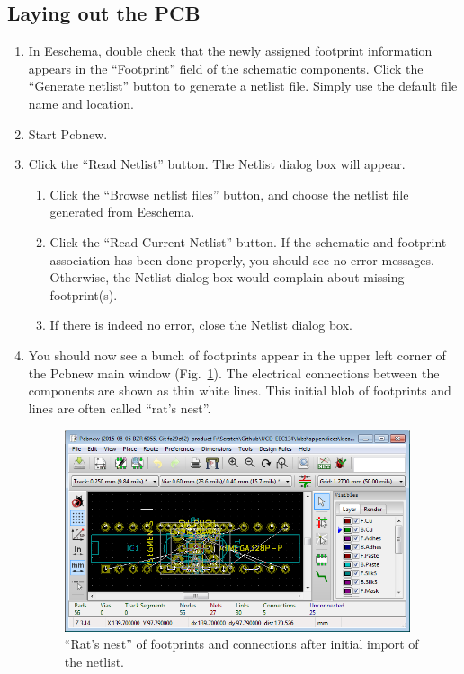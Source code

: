 \documentclass[12pt,letterpaper]{scrartcl}
\begin{document}
\subsection{Laying out the PCB}
\label{sec:pcb-layout}

\begin{enumerate}
	\item In Eeschema, double check that the newly assigned footprint information appears in the ``Footprint'' field of the schematic components. Click the ``Generate netlist'' button to generate a netlist file. Simply use the default file name and location. 
	\item Start Pcbnew. 
	\item Click the ``Read Netlist'' button. The Netlist dialog box will appear. 
		\begin{enumerate}
			\item Click the ``Browse netlist files'' button, and choose the netlist file generated from Eeschema. 
			
			\item Click the ``Read Current Netlist'' button. If the schematic and footprint association has been done properly, you should see no error messages. Otherwise, the Netlist dialog box would complain about missing footprint(s). 
			
			\item If there is indeed no error, close the Netlist dialog box. 
		\end{enumerate}
	\item You should now see a bunch of footprints appear in the upper left corner of the Pcbnew main window (Fig.~\ref{fig:ratsnest}). The electrical connections between the components are shown as thin white lines. This initial blob of footprints and lines are often called ``rat's nest''. 
		\begin{figure}[hp]
			\centering
			\includegraphics[width=4in]{ratsnest}
			\caption{``Rat's nest'' of footprints and connections after initial import of the netlist.}
			\label{fig:ratsnest}
		\end{figure}	
	

\end{enumerate}
\end{document}
